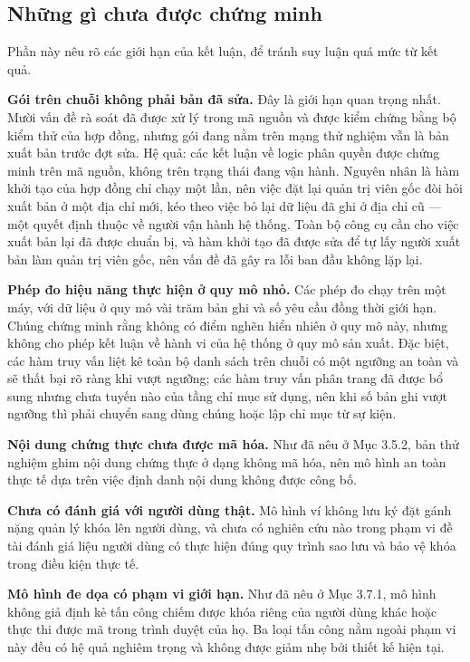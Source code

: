 \subsection{Những gì chưa được chứng minh}

Phần này nêu rõ các giới hạn của kết luận, để tránh suy luận quá mức từ kết quả.

\textbf{Gói trên chuỗi không phải bản đã sửa.} Đây là giới hạn quan trọng nhất. Mười vấn đề rà soát đã được xử lý trong mã nguồn và được kiểm chứng bằng bộ kiểm thử của hợp đồng, nhưng gói đang nằm trên mạng thử nghiệm vẫn là bản xuất bản trước đợt sửa. Hệ quả: các kết luận về logic phân quyền được chứng minh trên mã nguồn, không trên trạng thái đang vận hành. Nguyên nhân là hàm khởi tạo của hợp đồng chỉ chạy một lần, nên việc đặt lại quản trị viên gốc đòi hỏi xuất bản ở một địa chỉ mới, kéo theo việc bỏ lại dữ liệu đã ghi ở địa chỉ cũ --- một quyết định thuộc về người vận hành hệ thống. Toàn bộ công cụ cần cho việc xuất bản lại đã được chuẩn bị, và hàm khởi tạo đã được sửa để tự lấy người xuất bản làm quản trị viên gốc, nên vấn đề đã gây ra lỗi ban đầu không lặp lại.

\textbf{Phép đo hiệu năng thực hiện ở quy mô nhỏ.} Các phép đo chạy trên một máy, với dữ liệu ở quy mô vài trăm bản ghi và số yêu cầu đồng thời giới hạn. Chúng chứng minh rằng không có điểm nghẽn hiển nhiên ở quy mô này, nhưng không cho phép kết luận về hành vi của hệ thống ở quy mô sản xuất. Đặc biệt, các hàm truy vấn liệt kê toàn bộ danh sách trên chuỗi có một ngưỡng an toàn và sẽ thất bại rõ ràng khi vượt ngưỡng; các hàm truy vấn phân trang đã được bổ sung nhưng chưa tuyến nào của tầng chỉ mục sử dụng, nên khi số bản ghi vượt ngưỡng thì phải chuyển sang dùng chúng hoặc lập chỉ mục từ sự kiện.

\textbf{Nội dung chứng thực chưa được mã hóa.} Như đã nêu ở Mục 3.5.2, bản thử nghiệm ghim nội dung chứng thực ở dạng không mã hóa, nên mô hình an toàn thực tế dựa trên việc định danh nội dung không được công bố.

\textbf{Chưa có đánh giá với người dùng thật.} Mô hình ví không lưu ký đặt gánh nặng quản lý khóa lên người dùng, và chưa có nghiên cứu nào trong phạm vi đề tài đánh giá liệu người dùng có thực hiện đúng quy trình sao lưu và bảo vệ khóa trong điều kiện thực tế.

\textbf{Mô hình đe dọa có phạm vi giới hạn.} Như đã nêu ở Mục 3.7.1, mô hình không giả định kẻ tấn công chiếm được khóa riêng của người dùng khác hoặc thực thi được mã trong trình duyệt của họ. Ba loại tấn công nằm ngoài phạm vi này đều có hệ quả nghiêm trọng và không được giảm nhẹ bởi thiết kế hiện tại.

